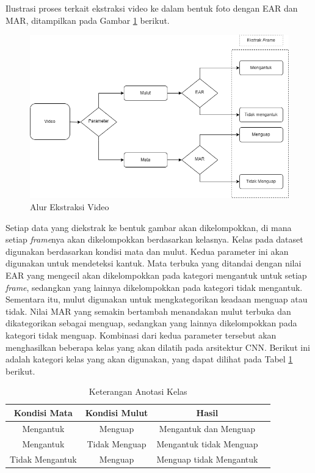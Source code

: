     Ilustrasi proses terkait ekstraksi video ke dalam bentuk foto dengan EAR dan MAR, ditampilkan pada Gambar \ref{Alur Ekstraksi Video} berikut.
    
  
    \begin{figure}[H]
        \includegraphics[width=1.0\textwidth]{figures/bab3/procesing.png}
        \caption{Alur Ekstraksi Video}
        \label{Alur Ekstraksi Video}
    \end{figure}

    
    
    Setiap data yang diekstrak ke bentuk gambar akan dikelompokkan, di mana setiap \textit{frame}nya akan dikelompokkan berdasarkan kelasnya. Kelas pada dataset digunakan berdasarkan kondisi mata dan mulut. Kedua parameter ini akan digunakan untuk mendeteksi kantuk. Mata terbuka yang ditandai dengan nilai EAR yang mengecil akan dikelompokkan pada kategori mengantuk untuk setiap \textit{frame}, 
    sedangkan yang lainnya dikelompokkan pada kategori tidak mengantuk. Sementara itu, mulut digunakan untuk mengkategorikan keadaan menguap atau tidak. Nilai MAR yang semakin bertambah menandakan mulut terbuka dan dikategorikan sebagai menguap, sedangkan yang lainnya dikelompokkan pada kategori tidak menguap. Kombinasi dari kedua parameter tersebut akan menghasilkan beberapa kelas yang akan dilatih pada arsitektur CNN. Berikut ini adalah kategori kelas yang akan digunakan, yang dapat dilihat pada Tabel \ref{Keterangan Anotasi Kelas} berikut.


    
    \begin{table}[h]
        \centering
        \caption{Keterangan Anotasi Kelas}
        \begin{tabular}{cccc}
            \hline
            \textbf{Kondisi Mata} & \textbf{Kondisi Mulut} & \textbf{Hasil} \\
            \midrule Mengantuk & Menguap &  Mengantuk dan Menguap\\
                     Mengantuk & Tidak Menguap &  Mengantuk tidak Menguap \\
                     Tidak Mengantuk & Menguap &  Menguap tidak Mengantuk\\
                
        
            \bottomrule
        \end{tabular}
        \label{Keterangan Anotasi Kelas}
    \end{table}
    

